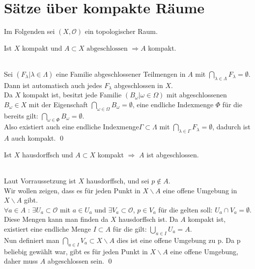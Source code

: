 \chapter{Sätze über kompakte Räume}
Im Folgenden sei \((X,\mathcal{O})\) ein topologischer Raum.
	\begin{Satz}
		Ist \(X\) kompakt und \(A \subset X \mbox{ abgeschlossen } \Rightarrow A\) kompakt.
	\end{Satz}
	
 
		\\
		Sei \((F_{\lambda} | \lambda \in \Lambda) \) eine Familie abgeschlossener Teilmengen in \(A\) mit \( \bigcap_{\lambda \in \Lambda } F_{\lambda} = \emptyset \).\\
		Dann ist automatisch auch jedes \(F_{\lambda} \) abgeschlossen in \(X\).\\
		Da \(X\) kompakt ist, besitzt jede Familie \((B_{\omega} | \omega \in \Omega) \) mit abgeschlossenen 
		\(B_{\omega} \in X \) mit der Eigenschaft \( \bigcap_{\omega \in \Omega} B_{\omega} = \emptyset\), eine 
		endliche Indexmenge \(\Phi\) für die bereits gilt: \( \bigcap_{\omega \in \Phi} B_{\omega} = \emptyset\).\\
		Also existiert auch eine endliche Indexmenge\( \Gamma \subset \Lambda \) mit \( \bigcap_{\lambda \in \Gamma } F_{\lambda} = \emptyset \), dadurch ist 
		\(A\) auch kompakt.
		\qed
		
		
	\begin{Satz}
		Ist \(X\) hausdorffsch und \(A \subset X \) kompakt \( \Rightarrow \) \(A\) ist abgeschlossen.
	\end{Satz}
	
	
		\\
		Laut Vorraussetzung ist \(X\) hausdorffsch, und sei \(p \notin A \). \\
		Wir wollen zeigen, dass es für jeden Punkt in \(X \backslash A \) eine offene Umgebung in \(X \backslash A \) gibt.\\
		\( \forall a \in A\) : \(\exists U_{a}\subset \mathcal{O} \) mit \(  a \in U_{a}\) und \(\exists V_{a}\subset \mathcal{O} \), \(  p \in V_{a}\) für die gelten soll:
		 \(U_{a} \cap V_{a} = \emptyset \). Diese Mengen kann man finden da \(X\) hausdorffsch ist. Da \(A\) kompakt ist, existiert eine endliche Menge \(I \subset A\) für die gilt:
		\( \bigcup_{a \in I} U_{a} = A \). \\
		Nun definiert man \(\bigcap_{a \in I} V_{a} \subset X\backslash A \) dies ist eine offene Umgebung zu p. Da p beliebig gewählt war, gibt es 
		für jeden Punkt in \(X\backslash A \) eine offene Umgebung, daher muss \(A\) abgeschlossen sein. \qed
		
